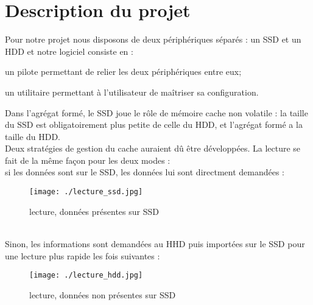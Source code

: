 \documentclass[a4paper,10pt]{article}
\begin{document}
\section{Description du projet}
Pour notre projet nous disposons de deux périphériques séparés : un SSD et un HDD et notre logiciel consiste en : 
\begin{description}
 \item un pilote permettant de relier les deux périphériques entre eux;
 \item un utilitaire permettant à l'utilisateur de maîtriser sa configuration.
\end{description}
Dans l'agrégat formé, le SSD joue le rôle de mémoire cache non volatile : la taille du SSD est obligatoirement plus petite de celle du HDD, et 
l'agrégat formé a la taille du HDD.\medskip \\
Deux stratégies de gestion du cache auraient dû être développées. La lecture se fait de la même façon pour les deux modes : \\
si les données sont sur le SSD, les données lui sont directment demandées : 
\begin{figure}[h]
  \texttt{[image: ./lecture\_ssd.jpg]}
  \caption{lecture, données présentes sur SSD}
\end{figure}
\bigskip\\
Sinon, les informations sont demandées au HHD puis importées sur le SSD pour une lecture plus rapide les fois suivantes : \\
\begin{figure}[h]
  \texttt{[image: ./lecture\_hdd.jpg]}
  \caption{lecture, données non présentes sur SSD}
\end{figure}
\end{document}
